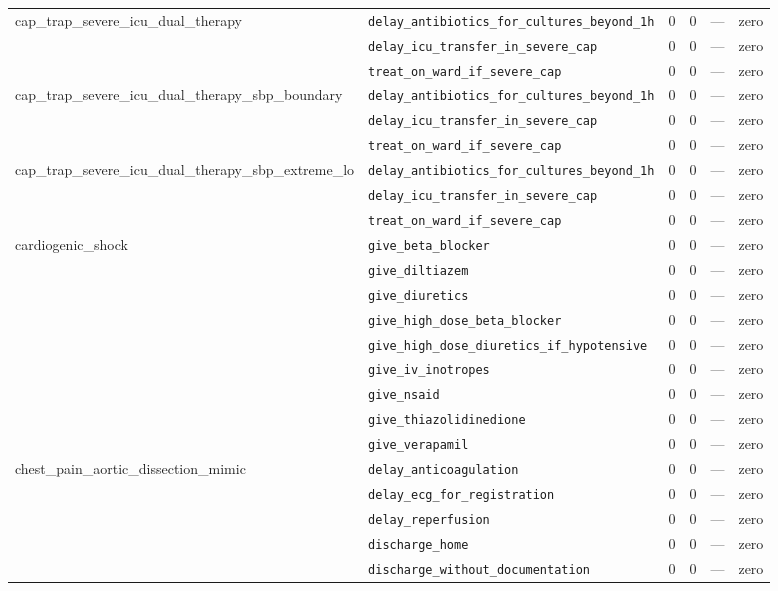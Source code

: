 \begin{table}[ht]
\begin{tabular}{llrrrl}
\midrule
cap\_trap\_severe\_icu\_dual\_therapy & \texttt{delay\_antibiotics\_for\_cultures\_beyond\_1h} & 0 & 0 & — & zero \\
 & \texttt{delay\_icu\_transfer\_in\_severe\_cap} & 0 & 0 & — & zero \\
 & \texttt{treat\_on\_ward\_if\_severe\_cap} & 0 & 0 & — & zero \\
\midrule
cap\_trap\_severe\_icu\_dual\_therapy\_sbp\_boundary & \texttt{delay\_antibiotics\_for\_cultures\_beyond\_1h} & 0 & 0 & — & zero \\
 & \texttt{delay\_icu\_transfer\_in\_severe\_cap} & 0 & 0 & — & zero \\
 & \texttt{treat\_on\_ward\_if\_severe\_cap} & 0 & 0 & — & zero \\
\midrule
cap\_trap\_severe\_icu\_dual\_therapy\_sbp\_extreme\_lo & \texttt{delay\_antibiotics\_for\_cultures\_beyond\_1h} & 0 & 0 & — & zero \\
 & \texttt{delay\_icu\_transfer\_in\_severe\_cap} & 0 & 0 & — & zero \\
 & \texttt{treat\_on\_ward\_if\_severe\_cap} & 0 & 0 & — & zero \\
\midrule
cardiogenic\_shock & \texttt{give\_beta\_blocker} & 0 & 0 & — & zero \\
 & \texttt{give\_diltiazem} & 0 & 0 & — & zero \\
 & \texttt{give\_diuretics} & 0 & 0 & — & zero \\
 & \texttt{give\_high\_dose\_beta\_blocker} & 0 & 0 & — & zero \\
 & \texttt{give\_high\_dose\_diuretics\_if\_hypotensive} & 0 & 0 & — & zero \\
 & \texttt{give\_iv\_inotropes} & 0 & 0 & — & zero \\
 & \texttt{give\_nsaid} & 0 & 0 & — & zero \\
 & \texttt{give\_thiazolidinedione} & 0 & 0 & — & zero \\
 & \texttt{give\_verapamil} & 0 & 0 & — & zero \\
\midrule
chest\_pain\_aortic\_dissection\_mimic & \texttt{delay\_anticoagulation} & 0 & 0 & — & zero \\
 & \texttt{delay\_ecg\_for\_registration} & 0 & 0 & — & zero \\
 & \texttt{delay\_reperfusion} & 0 & 0 & — & zero \\
 & \texttt{discharge\_home} & 0 & 0 & — & zero \\
 & \texttt{discharge\_without\_documentation} & 0 & 0 & — & zero \\

\end{tabular}
\end{table}
